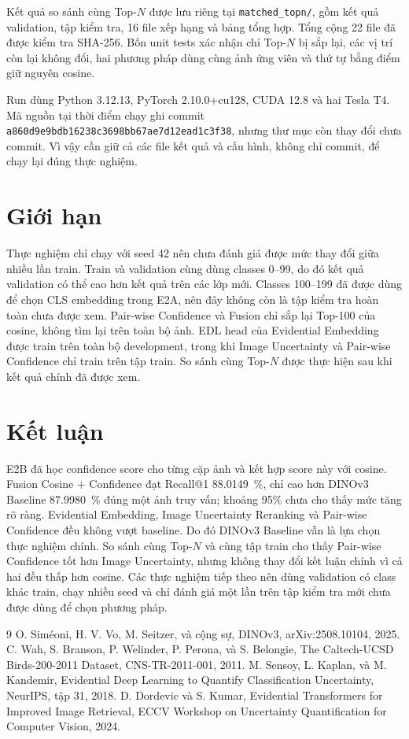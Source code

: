 \documentclass[11pt,a4paper]{article}
\begin{document}
Kết quả so sánh cùng Top-$N$ được lưu riêng tại
\texttt{matched\_topn/}, gồm kết quả validation, tập kiểm tra, 16 file xếp
hạng và bảng tổng hợp. Tổng cộng 22 file đã được kiểm tra SHA-256. Bốn unit
tests xác nhận chỉ Top-$N$ bị sắp lại, các vị trí còn lại không đổi, hai
phương pháp dùng cùng ảnh ứng viên và thứ tự bằng điểm giữ nguyên cosine.

Run dùng Python 3.12.13, PyTorch 2.10.0+cu128, CUDA 12.8 và hai Tesla T4.
Mã nguồn tại thời điểm chạy ghi commit
\texttt{a860d9e9bdb16238c3698bb67ae7d12ead1c3f38}, nhưng thư mục còn thay đổi
chưa commit. Vì vậy cần giữ cả các file kết quả và cấu hình, không chỉ commit,
để chạy lại đúng thực nghiệm.

\section{Giới hạn}
Thực nghiệm chỉ chạy với seed 42 nên chưa đánh giá được mức thay đổi giữa
nhiều lần train. Train và validation cùng dùng classes 0--99, do đó kết quả
validation có thể cao hơn kết quả trên các lớp mới. Classes 100--199 đã được
dùng để chọn CLS embedding trong E2A, nên đây không còn là tập kiểm tra hoàn
toàn chưa được xem. Pair-wise Confidence và Fusion chỉ sắp lại Top-100 của
cosine, không tìm lại trên toàn bộ ảnh. EDL head của Evidential Embedding
được train trên toàn bộ development, trong khi Image Uncertainty và
Pair-wise Confidence chỉ train trên tập train. So sánh cùng Top-$N$ được thực
hiện sau khi kết quả chính đã được xem.

\section{Kết luận}
E2B đã học confidence score cho từng cặp ảnh và kết hợp score này với cosine.
Fusion Cosine + Confidence đạt Recall@1
\SI{88.0149}{\percent}, chỉ cao hơn DINOv3 Baseline
\SI{87.9980}{\percent} đúng một ảnh truy vấn; khoảng 95\% chưa cho thấy mức
tăng rõ ràng. Evidential Embedding, Image Uncertainty Reranking và Pair-wise
Confidence đều không vượt baseline. Do đó DINOv3 Baseline vẫn là lựa chọn
thực nghiệm chính. So sánh cùng Top-$N$ và cùng tập train cho thấy Pair-wise
Confidence tốt hơn Image Uncertainty, nhưng không thay đổi kết luận chính vì
cả hai đều thấp hơn cosine. Các thực nghiệm tiếp theo nên dùng validation có
class khác train, chạy nhiều seed và chỉ đánh giá một lần trên tập kiểm tra
mới chưa được dùng để chọn phương pháp.

\begin{thebibliography}{9}
O. Siméoni, H. V. Vo, M. Seitzer, và cộng sự,
DINOv3, arXiv:2508.10104, 2025.
C. Wah, S. Branson, P. Welinder, P. Perona, và S. Belongie,
The Caltech-UCSD Birds-200-2011 Dataset, CNS-TR-2011-001, 2011.
M. Sensoy, L. Kaplan, và M. Kandemir,
Evidential Deep Learning to Quantify Classification Uncertainty,
NeurIPS, tập 31, 2018.
D. Dordevic và S. Kumar,
Evidential Transformers for Improved Image Retrieval,
ECCV Workshop on Uncertainty Quantification for Computer Vision, 2024.
\end{thebibliography}
\end{document}
